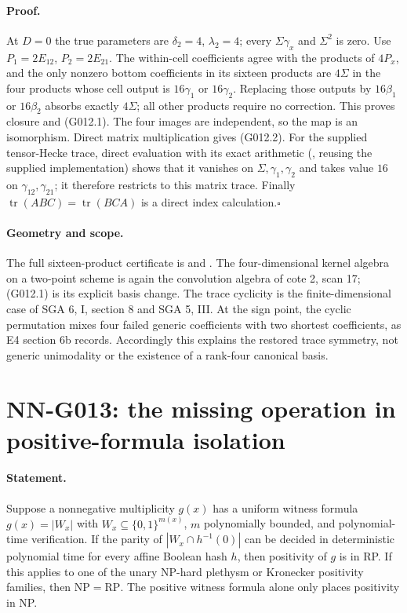 \paragraph{Proof.}
At $D=0$ the true parameters are $\delta_2=4$,
$\lambda_2=4$; every $\Sigma\gamma_x$ and $\Sigma^2$ is zero.
Use $P_1=2E_{12}$, $P_2=2E_{21}$. The within-cell
coefficients agree with the products of $4P_x$, and the
only nonzero bottom coefficients in its sixteen products
are $4\Sigma$ in the four products whose cell output is
$16\gamma_1$ or $16\gamma_2$. Replacing those outputs by
$16\beta_1$ or $16\beta_2$ absorbs exactly $4\Sigma$;
all other products require no correction. This proves closure
and (G012.1). The four images are independent, so the map is
an isomorphism. Direct matrix multiplication gives (G012.2).
For the supplied tensor-Hecke trace, direct evaluation
with its exact arithmetic (,
reusing the supplied implementation) shows that it vanishes on $\Sigma,\gamma_1,
\gamma_2$ and takes value $16$ on $\gamma_{12},\gamma_{21}$;
it therefore restricts to this matrix trace. Finally
$\operatorname{tr}(ABC)=\operatorname{tr}(BCA)$ is a direct
index calculation.\hfill$\square$

\paragraph{Geometry and scope.}
The full sixteen-product certificate is
 and
. The four-dimensional
kernel algebra on a two-point scheme is again the convolution
algebra of cote 2, scan 17; (G012.1) is its explicit basis change.
The trace cyclicity is the finite-dimensional case of SGA 6,
I, section 8 and SGA 5, III. At the sign point, the cyclic
permutation mixes four failed generic coefficients with two
shortest coefficients, as E4 section 6b records. Accordingly
this explains the restored trace symmetry, not generic
unimodality or the existence of a rank-four canonical basis.



\section{NN-G013: the missing operation in positive-formula isolation}
\paragraph{Statement.}
Suppose a nonnegative multiplicity $g(x)$ has a uniform witness
formula $g(x)=|W_x|$ with $W_x\subseteq\{0,1\}^{m(x)}$,
$m$ polynomially bounded, and polynomial-time verification.
If the parity of $|W_x\cap h^{-1}(0)|$ can be decided in
deterministic polynomial time for every affine Boolean hash
$h$, then positivity of $g$ is in RP. If this applies to one
of the unary NP-hard plethysm or Kronecker positivity families,
then $\mathrm{NP}=\mathrm{RP}$. The positive witness formula
alone only places positivity in NP.

